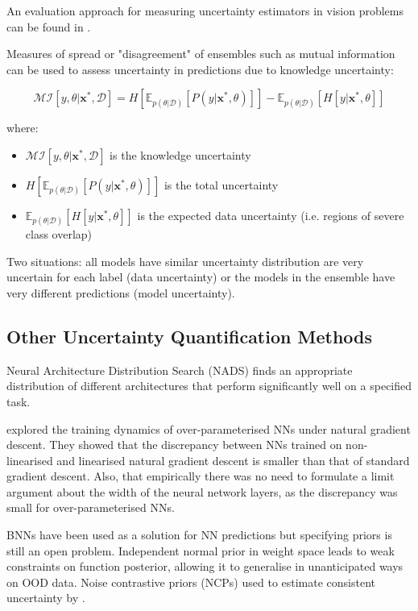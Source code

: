 \documentclass[twoside,11pt]{article}
\begin{document}
An evaluation approach for measuring uncertainty estimators in vision problems can be found in \cite{gustafsson2020evaluating}.

Measures of spread or "disagreement" of ensembles such as mutual information can be used to assess uncertainty in predictions due to knowledge uncertainty:

\[\mathcal{MI}\left[y, \theta | \textbf{x}^{*}, \mathcal{D}\right] = H[\mathbb{E}_{p(\theta | \mathcal{D})} [P(y|\textbf{x}^{*}, \theta)]] - \mathbb{E}_{p(\theta | \mathcal{D})}[H[y|\textbf{x}^{*}, \theta]]\]

where:
\begin{itemize}
\item $\mathcal{MI}\left[y, \theta | \textbf{x}^{*}, \mathcal{D}\right]$ is the knowledge uncertainty
\item $H[\mathbb{E}_{p(\theta | \mathcal{D})} [P(y|\textbf{x}^{*}, \theta)]]$ is the total uncertainty
\item $\mathbb{E}_{p(\theta | \mathcal{D})}[H[y|\textbf{x}^{*}, \theta]]$ is the expected data uncertainty (i.e. regions of severe class overlap)
\end{itemize}

Two situations: all models have similar uncertainty distribution are very uncertain for each label (data uncertainty) or the models in the ensemble have very different predictions (model uncertainty).

\subsection{Other Uncertainty Quantification Methods}
Neural Architecture Distribution Search (NADS) finds an appropriate distribution of different architectures that perform significantly well on a specified task.

explored the training dynamics of over-parameterised NNs under natural gradient descent.
They showed that the discrepancy between NNs trained on non-linearised and linearised natural gradient descent is smaller than that of standard gradient descent.
Also, that empirically there was no need to formulate a limit argument about the width of the neural network layers, as the discrepancy was small for over-parameterised NNs.

BNNs have been used as a solution for NN predictions but specifying priors is still an open problem.
Independent normal prior in weight space leads to weak constraints on function posterior, allowing it to generalise in unanticipated ways on OOD data.
Noise contrastive priors (NCPs) used to estimate consistent uncertainty by \cite{hafner2020noise}.
\end{document}
